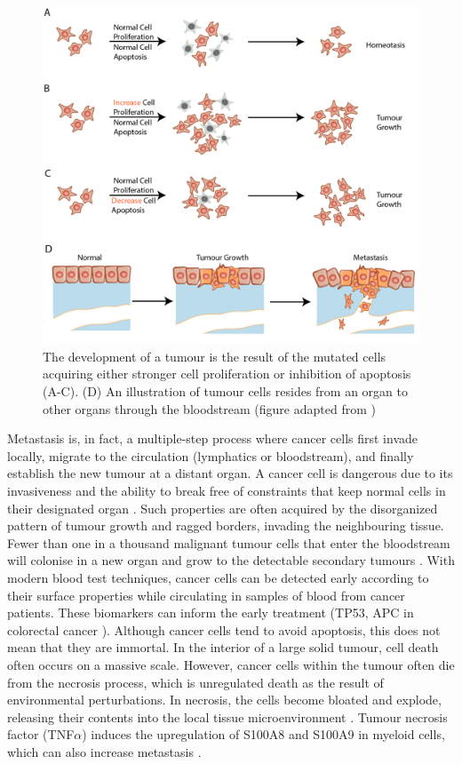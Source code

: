 \begin{figure}[htp]
    \centering
    \includegraphics[width=0.7\columnwidth]{Chapter1/Figures/Chap1_figure3.png}
    \caption[Tumorigenesis and metastasis process. ]{The development of a tumour is the result of the mutated cells acquiring either stronger cell proliferation or inhibition of apoptosis (A-C). (D) An illustration of tumour cells resides from an organ to other organs through the bloodstream (figure adapted from \cite{alberts2018molecular})}
    \label{fig:Chap1_figure3}
\end{figure}

Metastasis is, in fact, a multiple-step process where cancer cells first invade locally, migrate to the circulation (lymphatics or bloodstream), and finally establish the new tumour at a distant organ. A cancer cell is dangerous due to its invasiveness and the ability to break free of constraints that keep normal cells in their designated organ \cite{greaves2012clonal}. Such properties are often acquired by the disorganized pattern of tumour growth and ragged borders, invading the neighbouring tissue. Fewer than one in a thousand malignant tumour cells that enter the bloodstream will colonise in a new organ and grow to the detectable secondary tumours \cite{joyce2009microenvironmental}. With modern blood test techniques, cancer cells can be detected early according to their surface properties while circulating in samples of blood from cancer patients. These biomarkers can inform the early treatment (\ie TP53, APC in colorectal cancer \cite{markowitz2009molecular}). Although cancer cells tend to avoid apoptosis, this does not mean that they are immortal. In the interior of a large solid tumour, cell death often occurs on a massive scale. However, cancer cells within the tumour often die from the necrosis process, which is unregulated death as the result of environmental perturbations. In necrosis, the cells become bloated and explode, releasing their contents into the local tissue microenvironment \cite{hanahan2011hallmarksnext}. Tumour necrosis factor (TNF$\alpha$) induces the upregulation of S100A8 and S100A9 in myeloid cells, which can also increase metastasis \cite{hiratsuka2008s100a8, hiratsuka2006tumour}. 

